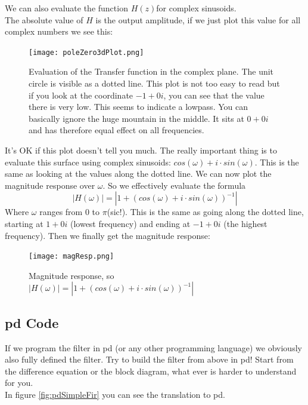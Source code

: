 {We can also evaluate the function $H(z)$for complex sinusoids.\\
The absolute value of $H$ is the output amplitude, if we just plot this value for all complex numbers we see this:

\begin{figure}[H]
	\centering
	\texttt{[image: poleZero3dPlot.png]}
	\caption[poles and zeros, 3D in the complex plane]
	{Evaluation of the Transfer function in the complex plane. The unit circle is visible as a dotted line. This plot is not too easy to read but if you look at the coordinate $-1+0i$, you can see that the value there is very low. This seems to indicate a lowpass. You can basically ignore the huge mountain in the middle. It sits at $0+0i$ and has therefore equal effect on all frequencies.}
	\label{fig:label}
\end{figure}

It's OK if this plot doesn't tell you much. The really important thing is to evaluate this surface using complex sinusoids:
$cos(\omega) + i\cdot sin(\omega)$. This is the same as looking at the values along the dotted line. We can now plot the magnitude response over $\omega$. So we effectively evaluate the formula
\begin{equation}
	|H(\omega)| = |1 + (cos(\omega)+i \cdot sin(\omega))^{-1}|
\end{equation}
Where $\omega$ ranges from $0$ to $\pi$(sic!). This is the same as going along the dotted line, starting at $1+0i$ (lowest frequency) and ending at $-1+0i$ (the highest frequency). Then we finally get the magnitude response:

\begin{figure}[H]
	\centering
	\texttt{[image: magResp.png]}
	\caption[Filter magnitude response]
	{Magnitude response, so $|H(\omega)| = |1 + (cos(\omega)+i \cdot sin(\omega))^{-1}|$}
	\label{fig:label}
\end{figure}



}

\subsection{pd Code} %
\label{sub:pd_code}
If we program the filter in pd (or any other programming language) we obviously also fully defined the filter. Try to build the filter from above in pd! Start from the difference equation or the block diagram, what ever is harder to understand for you.\\
In figure \ref{fig:pdSimpleFir} you can see the translation to pd.

